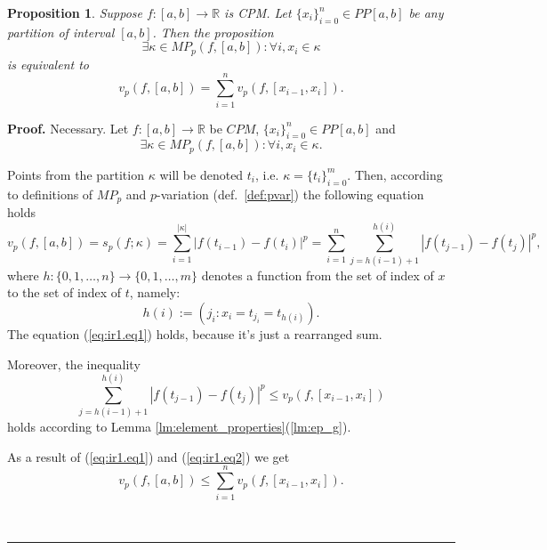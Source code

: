 \documentclass[12pt, a4paper]{article}
\newtheorem{proposition}[theorem]{Proposition}
\newenvironment{proof}[1][Proof]{\noindent \textbf{#1.} }{\  \rule{0.5em}{0.5em}}
\numberwithin{equation}{section}
\begin{document}
\begin{proposition}\label{prop:pvar_sum_x} 
  Suppose $f:[a,b] \rightarrow \mathbb{R}$ is CPM.
  Let $\{x_i\}_{i=0}^n \in PP[a,b]$ be any partition of interval $[a,b]$. 
  Then the proposition
  \begin{equation}
    \exists \kappa \in MP_{p}(f,[a,b]):\forall i,x_i \in \kappa
  \end{equation}
  is equivalent to 
  \begin{equation}
    v_p(f,[a,b]) = \sum_{i=1}^n v_p(f,[x_{i-1},x_i]).
  \end{equation}
\end{proposition}
\begin{proof}
  Necessary. Let $f:[a,b] \rightarrow \mathbb{R}$ be $CPM$,
  $\{x_i\}_{i=0}^n \in  PP[a,b]$ and 
  \begin{equation}
    \exists \kappa \in MP_{p}(f,[a,b]):\forall i,x_i \in \kappa. 
  \end{equation}
  
  Points from the partition $\kappa$ will be denoted $t_i$, i.e. $\kappa=\{t_i\}_{i=0}^m$.
  Then, according to definitions of $MP_{p}$ and $p$-variation (def.~\ref{def:pvar}) the following equation holds
  \begin{equation}\label{eq:ir1.eq1}
  v_p(f,[a,b])=s_{p}(f;\kappa)=\sum_{i=1}^{|\kappa|}|f(t_{i-1})-f(t_i)|^p 
    = \sum_{i=1}^n\sum_{j=h(i-1)+1}^{h(i)}|f(t_{j-1})-f(t_j)|^p,
  \end{equation}  
  where $h:\{0,1,\dots,n\} \rightarrow \{0,1,\dots,m\}$ denotes a function 
  from the set of index of $x$ to the set of index of $t$, namely:
  \begin{equation}\label{eq:ir1.eqx1}
    h(i):=(j_i : x_i = t_{j_i}=t_{h(i)}).
  \end{equation}  
  The equation (\ref{eq:ir1.eq1}) holds, because it's just a rearranged sum.
  
  Moreover, the inequality  
  \begin{equation}\label{eq:ir1.eq2}
  \sum_{j=h(i-1)+1}^{h(i)}|f(t_{j-1})-f(t_j)|^p \leq v_p(f,[x_{i-1},x_i])
  \end{equation}  
  holds according to Lemma \ref{lm:element_properties}(\ref{lm:ep_g}).
  
  As a result of (\ref{eq:ir1.eq1}) and (\ref{eq:ir1.eq2}) we get
  \begin{equation}\label{eq:ir1.eq3}
    v_p(f,[a,b]) \leq \sum_{i=1}^n v_p(f,[x_{i-1},x_i]).
  \end{equation}
  

\end{proof}
\end{document}
